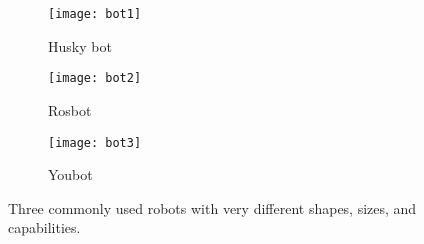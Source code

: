 \begin{figure}[H]
    \centering
    \begin{subfigure}[b]{0.15\textwidth}
        \texttt{[image: bot1]}
        \caption{Husky bot}
        \label{fig:bot1}
    \end{subfigure}
    \begin{subfigure}[b]{0.15\textwidth}
        \texttt{[image: bot2]}
        \caption{Rosbot}
        \label{fig:bot2}
    \end{subfigure}
    \begin{subfigure}[b]{0.15\textwidth}
        \texttt{[image: bot3]}
        \caption{Youbot}
        \label{fig:bot3}
    \end{subfigure}
    \label{fig:robots}
    \caption{Three commonly used robots with very different shapes, sizes, and capabilities.}\label{fig:bots}
\end{figure}

